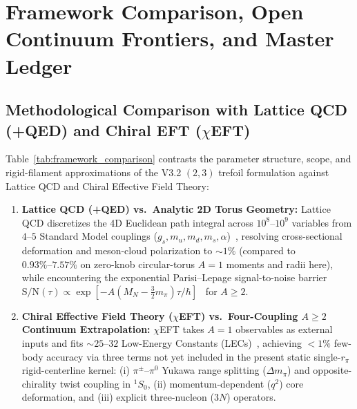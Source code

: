 \documentclass[11pt, a4paper]{article}
\begin{document}
\section{Framework Comparison, Open Continuum Frontiers, and Master Ledger}
\label{sec:master_summary}

\subsection{\texorpdfstring{Methodological Comparison with Lattice QCD (+QED) and Chiral EFT ($\chi$EFT)}{Methodological Comparison with Lattice QCD (+QED) and Chiral EFT}}
\label{sec:lqcd_chieft}
Table~\ref{tab:framework_comparison} contrasts the parameter structure, scope, and rigid-filament approximations of the V3.2 $(2,3)$ trefoil formulation against Lattice QCD and Chiral Effective Field Theory:
\begin{enumerate}[leftmargin=1.8em, itemsep=2pt]
    \item \textbf{Lattice QCD (+QED) vs.\ Analytic 2D Torus Geometry:} Lattice QCD discretizes the 4D Euclidean path integral across $10^8\text{--}10^9$ variables from $4\text{--}5$ Standard Model couplings ($g_s, m_u, m_d, m_s, \alpha$)~\cite{borsanyi2015}, resolving cross-sectional deformation and meson-cloud polarization to $\sim 1\%$ (compared to $0.93\%\text{--}7.57\%$ on zero-knob circular-torus $A = 1$ moments and radii here), while encountering the exponential Parisi--Lepage signal-to-noise barrier $\mathrm{S/N}(\tau) \propto \exp[-A(M_N - \frac{3}{2}m_\pi)\tau/\hbar]$~\cite{parisi1984} for $A \ge 2$.
    \item \textbf{Chiral Effective Field Theory ($\chi$EFT) vs.\ Four-Coupling $A \ge 2$ Continuum Extrapolation:} $\chi$EFT takes $A = 1$ observables as external inputs and fits $\sim 25\text{--}32$ Low-Energy Constants (LECs)~\cite{weinberg1990}, achieving $< 1\%$ few-body accuracy via three terms not yet included in the present static single-$r_\pi$ rigid-centerline kernel: (i) $\pi^\pm\text{--}\pi^0$ Yukawa range splitting ($\Delta m_\pi$) and opposite-chirality twist coupling in $^1S_0$, (ii) momentum-dependent ($q^2$) core deformation, and (iii) explicit three-nucleon ($3N$) operators.
\end{enumerate}
\end{document}

